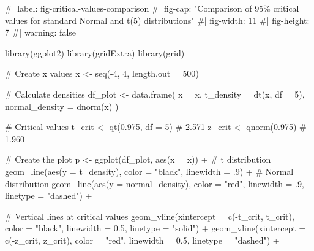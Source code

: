 \documentclass[
  letterpaper,
  DIV=11,
  numbers=noendperiod]{scrreprt}
\newenvironment{Shaded}{\begin{snugshade}}{\end{snugshade}}
\newcommand{\AttributeTok}[1]{\textcolor[rgb]{0.40,0.45,0.13}{#1}}
\newcommand{\CommentTok}[1]{\textcolor[rgb]{0.37,0.37,0.37}{#1}}
\newcommand{\DecValTok}[1]{\textcolor[rgb]{0.68,0.00,0.00}{#1}}
\newcommand{\FloatTok}[1]{\textcolor[rgb]{0.68,0.00,0.00}{#1}}
\newcommand{\FunctionTok}[1]{\textcolor[rgb]{0.28,0.35,0.67}{#1}}
\newcommand{\NormalTok}[1]{\textcolor[rgb]{0.00,0.23,0.31}{#1}}
\newcommand{\OtherTok}[1]{\textcolor[rgb]{0.00,0.23,0.31}{#1}}
\newcommand{\SpecialCharTok}[1]{\textcolor[rgb]{0.37,0.37,0.37}{#1}}
\newcommand{\StringTok}[1]{\textcolor[rgb]{0.13,0.47,0.30}{#1}}
\begin{document}
\begin{Shaded}
\begin{Highlighting}[]
\CommentTok{\#| label: fig{-}critical{-}values{-}comparison}
\CommentTok{\#| fig{-}cap: "Comparison of 95\% critical values for standard Normal and t(5) distributions"}
\CommentTok{\#| fig{-}width: 11}
\CommentTok{\#| fig{-}height: 7}
\CommentTok{\#| warning: false}

\FunctionTok{library}\NormalTok{(ggplot2)}
\FunctionTok{library}\NormalTok{(gridExtra)}
\FunctionTok{library}\NormalTok{(grid)}

\CommentTok{\# Create x values}
\NormalTok{x }\OtherTok{\textless{}{-}} \FunctionTok{seq}\NormalTok{(}\SpecialCharTok{{-}}\DecValTok{4}\NormalTok{, }\DecValTok{4}\NormalTok{, }\AttributeTok{length.out =} \DecValTok{500}\NormalTok{)}

\CommentTok{\# Calculate densities}
\NormalTok{df\_plot }\OtherTok{\textless{}{-}} \FunctionTok{data.frame}\NormalTok{(}
  \AttributeTok{x =}\NormalTok{ x,}
  \AttributeTok{t\_density =} \FunctionTok{dt}\NormalTok{(x, }\AttributeTok{df =} \DecValTok{5}\NormalTok{),}
  \AttributeTok{normal\_density =} \FunctionTok{dnorm}\NormalTok{(x)}
\NormalTok{)}

\CommentTok{\# Critical values}
\NormalTok{t\_crit }\OtherTok{\textless{}{-}} \FunctionTok{qt}\NormalTok{(}\FloatTok{0.975}\NormalTok{, }\AttributeTok{df =} \DecValTok{5}\NormalTok{)  }\CommentTok{\# 2.571}
\NormalTok{z\_crit }\OtherTok{\textless{}{-}} \FunctionTok{qnorm}\NormalTok{(}\FloatTok{0.975}\NormalTok{)        }\CommentTok{\# 1.960}

\CommentTok{\# Create the plot}
\NormalTok{p }\OtherTok{\textless{}{-}} \FunctionTok{ggplot}\NormalTok{(df\_plot, }\FunctionTok{aes}\NormalTok{(}\AttributeTok{x =}\NormalTok{ x)) }\SpecialCharTok{+}
  \CommentTok{\# t distribution}
  \FunctionTok{geom\_line}\NormalTok{(}\FunctionTok{aes}\NormalTok{(}\AttributeTok{y =}\NormalTok{ t\_density), }\AttributeTok{color =} \StringTok{"black"}\NormalTok{, }\AttributeTok{linewidth =}\NormalTok{ .}\DecValTok{9}\NormalTok{) }\SpecialCharTok{+}
  \CommentTok{\# Normal distribution}
  \FunctionTok{geom\_line}\NormalTok{(}\FunctionTok{aes}\NormalTok{(}\AttributeTok{y =}\NormalTok{ normal\_density), }\AttributeTok{color =} \StringTok{"red"}\NormalTok{, }\AttributeTok{linewidth =}\NormalTok{ .}\DecValTok{9}\NormalTok{, }\AttributeTok{linetype =} \StringTok{"dashed"}\NormalTok{) }\SpecialCharTok{+}
  
  \CommentTok{\# Vertical lines at critical values}
  \FunctionTok{geom\_vline}\NormalTok{(}\AttributeTok{xintercept =} \FunctionTok{c}\NormalTok{(}\SpecialCharTok{{-}}\NormalTok{t\_crit, t\_crit), }
             \AttributeTok{color =} \StringTok{"black"}\NormalTok{, }\AttributeTok{linewidth =} \FloatTok{0.5}\NormalTok{, }\AttributeTok{linetype =} \StringTok{"solid"}\NormalTok{) }\SpecialCharTok{+}
  \FunctionTok{geom\_vline}\NormalTok{(}\AttributeTok{xintercept =} \FunctionTok{c}\NormalTok{(}\SpecialCharTok{{-}}\NormalTok{z\_crit, z\_crit), }
             \AttributeTok{color =} \StringTok{"red"}\NormalTok{, }\AttributeTok{linewidth =} \FloatTok{0.5}\NormalTok{, }\AttributeTok{linetype =} \StringTok{"dashed"}\NormalTok{) }\SpecialCharTok{+}
  

\end{Highlighting}
\end{Shaded}
\end{document}
